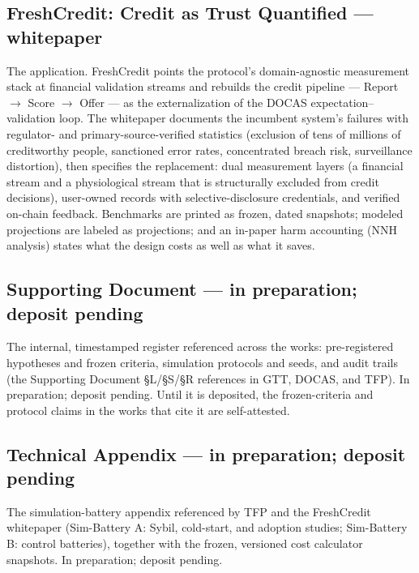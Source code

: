 \documentclass[11pt]{article}
\begin{document}
\subsection*{\texorpdfstring{FreshCredit: Credit as Trust Quantified --- whitepaper}{FreshCredit: Credit as Trust Quantified -- whitepaper}}

The application. FreshCredit points the protocol's domain-agnostic measurement
stack at financial validation streams and rebuilds the credit pipeline ---
Report $\to$ Score $\to$ Offer --- as the externalization of the DOCAS
expectation--validation loop. The whitepaper documents the incumbent system's
failures with regulator- and primary-source-verified statistics (exclusion of
tens of millions of creditworthy people, sanctioned error rates, concentrated
breach risk, surveillance distortion), then specifies the replacement: dual
measurement layers (a financial stream and a physiological stream that is
structurally excluded from credit decisions), user-owned records with
selective-disclosure credentials, and verified on-chain feedback. Benchmarks are
printed as frozen, dated snapshots; modeled projections are labeled as
projections; and an in-paper harm accounting (NNH analysis) states what the
design costs as well as what it saves.

\subsection*{Supporting Document --- in preparation; deposit pending}

The internal, timestamped register referenced across the works: pre-registered
hypotheses and frozen criteria, simulation protocols and seeds, and audit trails (the Supporting Document \S{}L/\S{}S/\S{}R references in GTT, DOCAS, and TFP). In preparation; deposit pending. Until it is deposited, the frozen-criteria and protocol claims in the works that cite it are self-attested.

\subsection*{Technical Appendix --- in preparation; deposit pending}

The simulation-battery appendix referenced by TFP and the FreshCredit
whitepaper (Sim-Battery A: Sybil, cold-start, and adoption studies;
Sim-Battery B: control batteries), together with the frozen, versioned cost calculator snapshots. In preparation; deposit pending.
\end{document}
